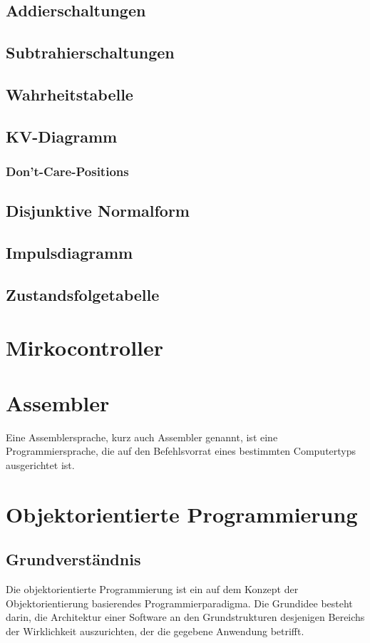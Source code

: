 \documentclass[12pt,a4paper]{article}
\begin{document}
\subsection{Addierschaltungen}
\subsection{Subtrahierschaltungen}
\subsection{Wahrheitstabelle}
\subsection{KV-Diagramm}
\subsubsection{Don't-Care-Positions}
\subsection{Disjunktive Normalform}
\subsection{Impulsdiagramm}
\subsection{Zustandsfolgetabelle}
\section{Mirkocontroller}
\section{Assembler}
Eine Assemblersprache, kurz auch Assembler genannt, ist eine Programmiersprache, die auf den Befehlsvorrat eines bestimmten Computertyps ausgerichtet ist.
\section{Objektorientierte Programmierung}
\subsection{Grundverständnis}
Die objektorientierte Programmierung ist ein auf dem Konzept der Objektorientierung basierendes Programmierparadigma. Die Grundidee besteht darin, die Architektur einer Software an den Grundstrukturen desjenigen Bereichs der Wirklichkeit auszurichten, der die gegebene Anwendung betrifft.
\end{document}
